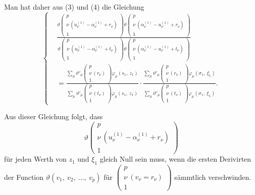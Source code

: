 \documentclass[12pt,a4paper]{article}
\begin{document}
Man hat daher aus (3) und (4) die Gleichung
\begin{equation}
\tag{5}
\left\{
\begin{aligned}
&\frac{\vartheta\left(\begin{array}{c} p\\ \nu\ (u_\nu^{(1)} - \alpha_\nu^{(1)} + r_\nu)\\ 1 \end{array}\right) \vartheta\left(\begin{array}{c} p\\ \nu\ (\alpha_\nu^{(1)} - u_\nu^{(1)} + r_\nu)\\ 1 \end{array}\right)}{\vartheta\left(\begin{array}{c} p\\ \nu\ (u_\nu^{(1)} - \alpha_\nu^{(1)} + t_\nu)\\ 1 \end{array}\right) \vartheta\left(\begin{array}{c} p\\ \nu\ (\alpha_\nu^{(1)} - u_\nu^{(1)} + t_\nu)\\ 1 \end{array}\right)}\\[1ex]
&= \frac{\sum\limits_\mu \vartheta'_\mu\left(\begin{array}{c} p\\ \nu\ (r_\nu)\\ 1 \end{array}\right) \varphi_\mu(s_1,\ z_1)}{\sum\limits_\mu \vartheta'_\mu\left(\begin{array}{c} p\\ \nu\ (t_\nu)\\ 1 \end{array}\right) \varphi_\mu(s_1,\ z_1)} \cdot \frac{\sum\limits_\mu \vartheta'_\mu\left(\begin{array}{c} p\\ \nu\ (r_\nu)\\ 1 \end{array}\right) \varphi_\mu(\sigma_1,\ \xi_1)}{\sum\limits_\mu \vartheta'_\mu\left(\begin{array}{c} p\\ \nu\ (t_\nu)\\ 1 \end{array}\right) \varphi_\mu(\sigma_1,\ \xi_1)}. \end{aligned}
\right.
\end{equation}

Aus dieser Gleichung folgt, dass
\[ \vartheta\left(\begin{array}{c} p\\ \nu\ (u_\nu^{(1)} - \alpha_\nu^{(1)} + r_\nu)\\ 1 \end{array}\right) \]
für jeden Werth von $z_1$ und $\xi_1$ gleich Null sein muss, wenn die ersten Derivirten der Function $\vartheta(v_1,\ v_2,\ \ldots,\ v_p)$ für $\left(\begin{array}{c} p\\ \nu\ (v_\nu = r_\nu)\\ 1 \end{array}\right)$ sämmtlich verschwinden.
\end{document}
